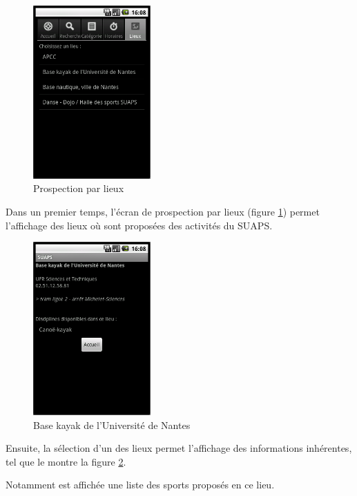 \documentclass[french, titlepage, 11pt, a4paper]{article}
\begin{document}
	\begin{figure}[htb]
		\centering
		\includegraphics[width=0.4\textwidth]{lieux.png}
		\caption{Prospection par lieux}
		\label{fig:lieux}
	\end{figure}

	Dans un premier temps, l'écran de prospection par lieux (figure
	\ref{fig:lieux}) permet l'affichage des lieux où sont proposées des
	activités du SUAPS.

	\begin{figure}[htb]
		\centering
		\includegraphics[width=0.4\textwidth]{basekayak.png}
		\caption{Base kayak de l'Université de Nantes}
		\label{fig:basekayak}
	\end{figure}

	Ensuite, la sélection d'un des lieux permet l'affichage des informations
	inhérentes, tel que le montre la figure \ref{fig:basekayak}.

	Notamment est affichée une liste des sports proposés en ce lieu.
\end{document}
